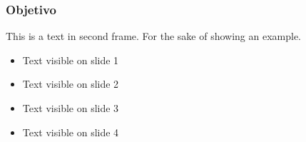 \begin{frame}
\frametitle{Objetivo}
This is a text in second frame. 
For the sake of showing an example.

\begin{itemize}
	\item<1-> Text visible on slide 1
	\item<2-> Text visible on slide 2
	\item<3> Text visible on slide 3
	\item<4-> Text visible on slide 4
\end{itemize}

\end{frame}